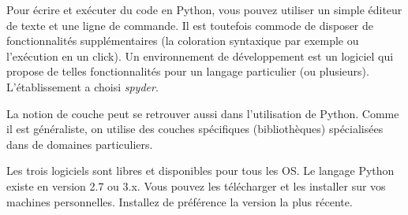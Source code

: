 Pour écrire et exécuter du code en Python, vous pouvez utiliser un simple éditeur de texte et une ligne de commande. Il est toutefois commode de disposer de fonctionnalités supplémentaires (la coloration syntaxique par exemple ou l'exécution en un click). Un environnement de développement est un logiciel qui propose de telles fonctionnalités pour un langage particulier (ou plusieurs). L'établissement a choisi \emph{spyder}.

La notion de couche peut se retrouver aussi dans l'utilisation de Python. Comme il est généraliste, on utilise des couches spécifiques (bibliothèques) spécialisées dans de domaines particuliers.

Les trois logiciels sont libres et disponibles pour tous les OS. Le langage Python existe en version 2.7 ou 3.x. Vous pouvez les télécharger et les installer sur vos machines personnelles. Installez de préférence la version la plus récente. 

